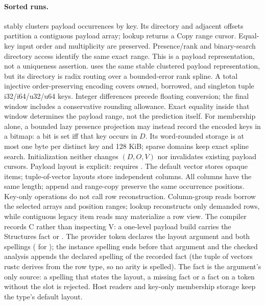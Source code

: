 \paragraph{Sorted runs.}
 stably clusters payload occurrences by key. Its directory
and adjacent offsets partition a contiguous payload array; lookup returns a
Copy range cursor. Equal-key input order and multiplicity are preserved.
Presence/rank and binary-search directory access identify the same exact
range. This is a payload representation, not a uniqueness assertion.
 uses the same stable clustered payload representation, but its
directory is radix routing over a bounded-error rank spline. A total injective
order-preserving  encoding covers owned, borrowed, and singleton
tuple i32/i64/u32/u64 keys. Integer differences precede floating conversion;
the final window includes a conservative rounding allowance. Exact equality
inside that window determines the payload range, not the prediction itself.
For membership alone, a bounded lazy presence projection may instead record
the encoded keys in a bitmap: a bit is set iff that key occurs in $D$.
Its word-rounded storage is at most one byte per distinct key and 128 KiB;
sparse domains keep exact spline search. Initialization neither changes
$(D,O,V)$ nor invalidates existing payload cursors.
Payload layout is explicit:  requires
. The default vector stores opaque items;
tuple-of-vector layouts store independent columns. All columns have the same
length; append and range-copy preserve the same occurrence positions.
Key-only operations do not call row reconstruction. Column-group reads
borrow the selected arrays and position ranges; lookup reconstructs only
demanded rows, while contiguous legacy item reads may materialize a row view.
The compiler records C rather than inspecting V: a one-level payload build
carries the Structures fact  or . The
provider token declares the layout argument and both spellings
(
for ); the instance spelling ends before that argument and
the checked analysis appends the declared spelling of the recorded fact
(the tuple of vectors rustc derives from the row type, so no arity is spelled).
The fact is the argument's only source: a spelling that states the layout, a
missing fact or a fact on a token without the slot is rejected. Host readers
and key-only membership storage keep the type's default layout.
